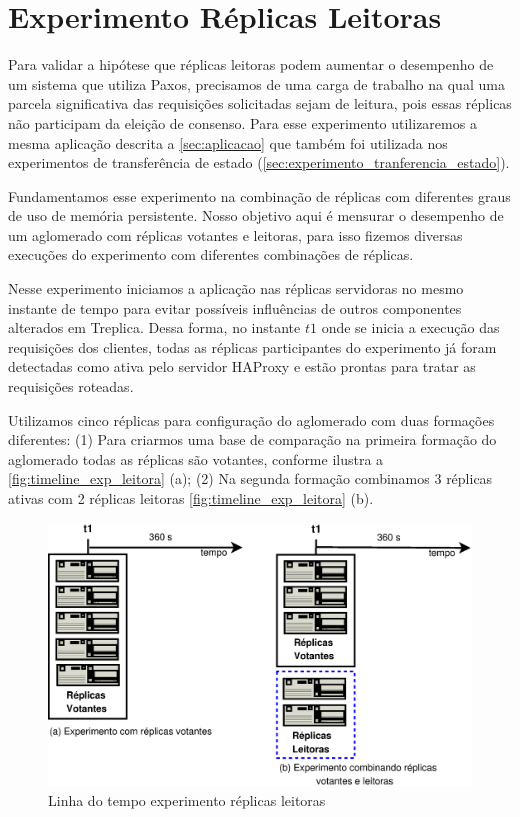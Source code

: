 \section{Experimento Réplicas Leitoras}\label{sec:experimento_replicas_leitoras}

Para validar a hipótese que réplicas leitoras podem aumentar o desempenho de um sistema
que utiliza Paxos, precisamos de uma carga de trabalho na qual uma parcela significativa
das requisições solicitadas sejam de leitura, pois essas réplicas não participam da
eleição de consenso. Para esse experimento utilizaremos a mesma aplicação descrita a
\autoref{sec:aplicacao} que também foi utilizada nos experimentos de transferência de
estado (\autoref{sec:experimento_tranferencia_estado}).

Fundamentamos esse experimento na combinação de réplicas com diferentes graus de uso de
memória persistente. Nosso objetivo aqui é mensurar o desempenho de um aglomerado com
réplicas votantes e leitoras, para isso fizemos diversas execuções do experimento com
diferentes combinações de réplicas.

Nesse experimento iniciamos a aplicação nas réplicas servidoras no mesmo instante de tempo
para evitar possíveis influências de outros componentes alterados em Treplica. Dessa
forma, no instante $t1$ onde se inicia a execução das requisições dos clientes, todas as
réplicas participantes do experimento já foram detectadas como ativa pelo servidor HAProxy
e estão prontas para tratar as requisições roteadas.

Utilizamos cinco réplicas para configuração do aglomerado com duas formações diferentes:
(1) Para criarmos uma base de comparação na primeira formação do aglomerado todas as
réplicas são votantes, conforme ilustra a \autoref{fig:timeline_exp_leitora} (a); (2) Na
segunda formação combinamos 3 réplicas ativas com 2 réplicas leitoras
\autoref{fig:timeline_exp_leitora} (b).

\begin{figure}[ht]
  \centering
  \includegraphics[width=14cm]{conteudo/capitulos/figuras/timeline_exp_leitora.eps}
  \caption{Linha do tempo experimento réplicas leitoras}
  \label{fig:timeline_exp_leitora}
\end{figure}

